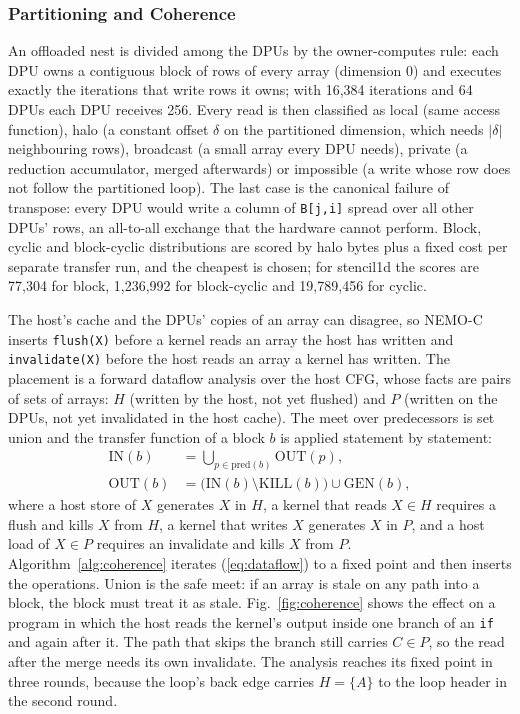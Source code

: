 \documentclass{ieeeaccess}
\begin{document}
\subsubsection{Partitioning and Coherence}
\label{sec:partcoh}
An offloaded nest is divided among the DPUs by the owner-computes rule: each DPU owns a contiguous block of rows of every array (dimension 0) and executes exactly the iterations that write rows it owns; with 16,384 iterations and 64 DPUs each DPU receives 256. Every read is then classified as local (same access function), halo (a constant offset $\delta$ on the partitioned dimension, which needs $|\delta|$ neighbouring rows), broadcast (a small array every DPU needs), private (a reduction accumulator, merged afterwards) or impossible (a write whose row does not follow the partitioned loop). The last case is the canonical failure of transpose: every DPU would write a column of \texttt{B[j,i]} spread over all other DPUs' rows, an all-to-all exchange that the hardware cannot perform. Block, cyclic and block-cyclic distributions are scored by halo bytes plus a fixed cost per separate transfer run, and the cheapest is chosen; for stencil1d the scores are 77,304 for block, 1,236,992 for block-cyclic and 19,789,456 for cyclic.

The host's cache and the DPUs' copies of an array can disagree, so NEMO-C inserts \texttt{flush(X)} before a kernel reads an array the host has written and \texttt{invalidate(X)} before the host reads an array a kernel has written. The placement is a forward dataflow analysis over the host CFG, whose facts are pairs of sets of arrays: $H$ (written by the host, not yet flushed) and $P$ (written on the DPUs, not yet invalidated in the host cache). The meet over predecessors is set union and the transfer function of a block $b$ is applied statement by statement:
\begin{equation}
\begin{aligned}
\mathrm{IN}(b) &= \textstyle\bigcup_{p\in\mathrm{pred}(b)} \mathrm{OUT}(p),\\
\mathrm{OUT}(b) &= \big(\mathrm{IN}(b) \setminus \mathrm{KILL}(b)\big) \cup \mathrm{GEN}(b),
\end{aligned}
\label{eq:dataflow}
\end{equation}
where a host store of $X$ generates $X$ in $H$, a kernel that reads $X\in H$ requires a flush and kills $X$ from $H$, a kernel that writes $X$ generates $X$ in $P$, and a host load of $X\in P$ requires an invalidate and kills $X$ from $P$. Algorithm~\ref{alg:coherence} iterates (\ref{eq:dataflow}) to a fixed point and then inserts the operations. Union is the safe meet: if an array is stale on any path into a block, the block must treat it as stale. Fig.~\ref{fig:coherence} shows the effect on a program in which the host reads the kernel's output inside one branch of an \texttt{if} and again after it. The path that skips the branch still carries $C\in P$, so the read after the merge needs its own invalidate. The analysis reaches its fixed point in three rounds, because the loop's back edge carries $H=\{A\}$ to the loop header in the second round.
\end{document}
